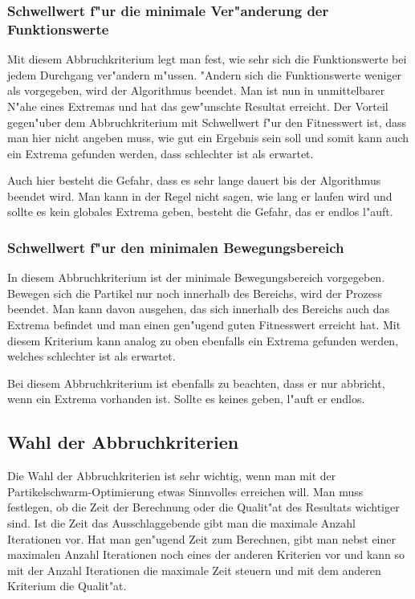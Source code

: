 \subsubsection{Schwellwert f"ur die minimale Ver"anderung der Funktionswerte}
Mit diesem Abbruchkriterium legt man fest, wie sehr sich die
Funktionswerte bei jedem Durchgang ver"andern m"ussen. "Andern sich die
Funktionswerte weniger als vorgegeben, wird der Algorithmus beendet. Man
ist nun in unmittelbarer N"ahe eines Extremas und hat das gew"unschte
Resultat erreicht. Der Vorteil gegen"uber dem Abbruchkriterium mit
Schwellwert f"ur den Fitnesswert ist, dass man hier nicht angeben muss,
wie gut ein Ergebnis sein soll und somit kann auch ein Extrema gefunden
werden, dass schlechter ist als erwartet. 

Auch hier besteht die Gefahr, dass es sehr lange dauert bis der Algorithmus
beendet wird. Man kann in der Regel nicht sagen, wie lang er laufen
wird und sollte es kein globales Extrema geben, besteht die Gefahr,
das er endlos l"auft.

\subsubsection{Schwellwert f"ur den minimalen Bewegungsbereich}
In diesem Abbruchkriterium ist der minimale Bewegungsbereich
vorgegeben. Bewegen sich die Partikel nur noch innerhalb des Bereichs,
wird der Prozess beendet. Man kann davon ausgehen, das sich innerhalb
des Bereichs auch das Extrema befindet und man einen gen"ugend guten
Fitnesswert erreicht hat. Mit diesem Kriterium kann analog zu oben
ebenfalls ein Extrema gefunden werden, welches schlechter ist als
erwartet.

Bei diesem Abbruchkriterium ist ebenfalls zu beachten, dass er nur
abbricht, wenn ein Extrema vorhanden ist. Sollte es keines geben, l"auft
er endlos.

\subsection{Wahl der Abbruchkriterien}
Die Wahl der Abbruchkriterien ist sehr wichtig, wenn man mit der
Partikelschwarm-Optimie\-rung etwas Sinnvolles erreichen will. Man muss
festlegen, ob die Zeit der Berechnung oder die Qualit"at des Resultats
wichtiger sind. Ist die Zeit das Ausschlaggebende gibt man die maximale
Anzahl Iterationen vor. Hat man gen"ugend Zeit zum Berechnen, gibt
man nebst einer maximalen Anzahl Iterationen noch eines der anderen
Kriterien vor und kann so mit der Anzahl Iterationen die maximale Zeit
steuern und mit dem anderen Kriterium die Qualit"at.

